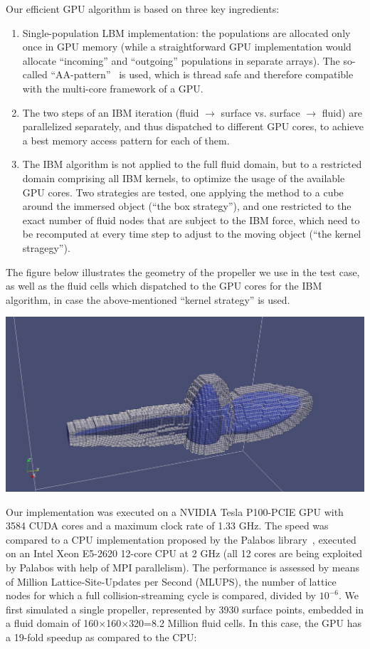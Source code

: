 \documentclass{cilamce}
\begin{document}
Our efficient GPU algorithm is based on three key ingredients:
\begin{enumerate}
    \item Single-population LBM implementation: the populations are allocated only once in GPU memory (while a straightforward GPU implementation would allocate ``incoming'' and ``outgoing'' populations in separate arrays). The so-called ``AA-pattern''~\cite{aa} is used, which is thread safe and therefore compatible with the multi-core framework of a GPU.
    \item The two steps of an IBM iteration (fluid $\rightarrow$ surface vs. surface $\rightarrow$ fluid) are parallelized separately, and thus dispatched to different GPU cores, to achieve a best memory access pattern for each of them.
    \item The IBM algorithm is not applied to the full fluid domain, but to a restricted domain comprising all IBM kernels, to optimize the usage of the available GPU cores. Two strategies are tested, one applying the method to a cube around the immersed object (``the box strategy''), and one restricted to the exact number of fluid nodes that are subject to the IBM force, which need to be recomputed at every time step to adjust to the moving object (``the kernel stragegy'').
\end{enumerate}

The figure below illustrates the geometry of the propeller we use in the test case, as well as the fluid cells which dispatched to the GPU cores for the IBM algorithm, in case the above-mentioned ``kernel strategy'' is used.

\begin{center}
\includegraphics[width=.5\textwidth]{kernel-strategy.png}
\end{center}

Our implementation was executed on a NVIDIA Tesla P100-PCIE GPU with 3584 CUDA cores and a maximum clock rate of 1.33 GHz. The speed was compared to a CPU implementation proposed by the Palabos library~\cite{palabos}, executed on an Intel Xeon E5-2620 12-core CPU at 2 GHz (all 12 cores are being exploited by Palabos with help of MPI parallelism). The performance is assessed by means of Million Lattice-Site-Updates per Second (MLUPS), the number of lattice nodes for which a full collision-streaming cycle is compared, divided by $10^{-6}$. We first simulated a single propeller, represented by 3930 surface points, embedded in a fluid domain of 160$\times$160$\times$320=8.2 Million fluid cells. In this case, the GPU has a 19-fold speedup as compared to the CPU:
\end{document}
